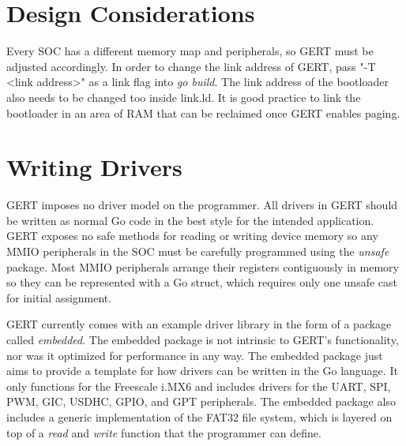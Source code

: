 \section{Design Considerations}
Every SOC has a different memory map and peripherals, so GERT must be adjusted
accordingly. In order to change the link address of GERT, pass "-T <link address>"
as a link flag into \textit{go build}. The link address of the bootloader also needs
to be changed too inside link.ld. It is good practice to link the bootloader in an
area of RAM that can be reclaimed once GERT enables paging.

\section{Writing Drivers}
GERT imposes no driver model on the programmer. All drivers in
GERT should be written as normal Go code in the best style for
the intended application. GERT exposes no safe methods for reading
or writing device memory so any MMIO peripherals in the SOC must be
carefully programmed using the \textit{unsafe} package. Most MMIO
peripherals arrange their registers contiguously in memory so they
can be represented with a Go struct, which requires only one unsafe cast
for initial assignment.

GERT currently comes with an example driver
library in the form of a package called \textit{embedded}. The embedded package is not intrinsic to GERT's
functionality, nor was it optimized for performance in any way. The embedded package
just aims to provide a template for how drivers can be written in the Go language.
It only functions for the Freescale i.MX6 and includes drivers for the UART, SPI, PWM, GIC, USDHC, GPIO, and GPT peripherals.
The embedded package also includes a generic implementation of the FAT32 file system, which is
layered on top of a \textit{read} and \textit{write} function that the programmer can define.


